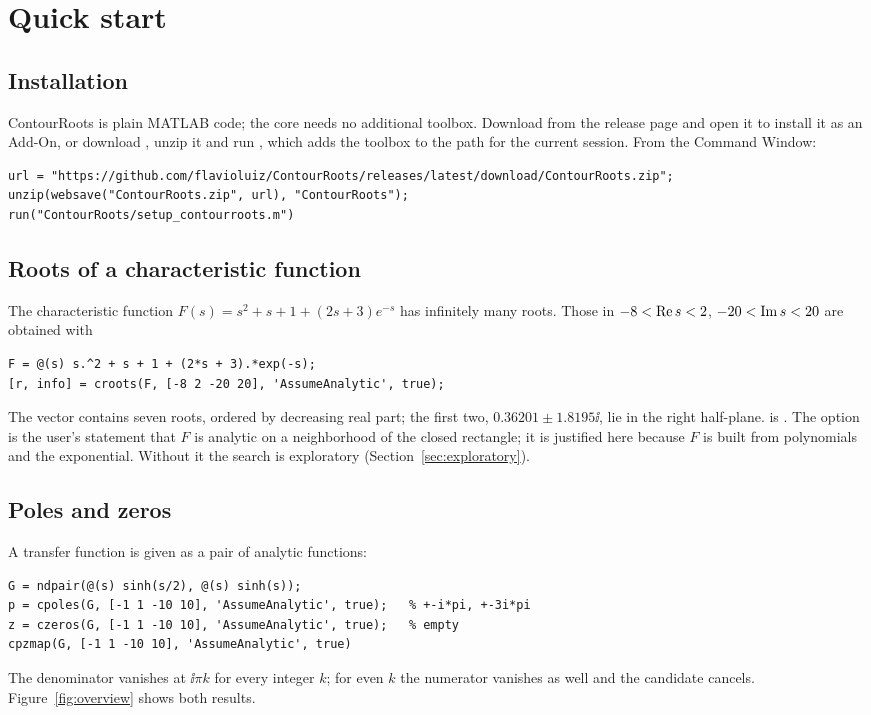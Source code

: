 \chapter{Quick start}\label{ch:quick}

\section{Installation}

ContourRoots is plain MATLAB code; the core needs no additional toolbox.
Download  from the release page and open it to
install it as an Add-On, or download , unzip it and
run , which adds the toolbox to the path for the
current session. From the Command Window:
\begin{lstlisting}
url = "https://github.com/flavioluiz/ContourRoots/releases/latest/download/ContourRoots.zip";
unzip(websave("ContourRoots.zip", url), "ContourRoots");
run("ContourRoots/setup_contourroots.m")
\end{lstlisting}

\section{Roots of a characteristic function}

The characteristic function $F(s)=s^2+s+1+(2s+3)e^{-s}$ has infinitely
many roots. Those in $-8<\operatorname{Re} s<2$, $-20<\operatorname{Im} s<20$ are obtained with
\begin{lstlisting}
F = @(s) s.^2 + s + 1 + (2*s + 3).*exp(-s);
[r, info] = croots(F, [-8 2 -20 20], 'AssumeAnalytic', true);
\end{lstlisting}
The vector  contains seven roots, ordered by decreasing real part;
the first two, $0.36201\pm1.8195\ii$, lie in the right half-plane.
 is . The option
 is the user's statement that $F$ is analytic
on a neighborhood of the closed rectangle; it is justified here because
$F$ is built from polynomials and the exponential. Without it the search
is exploratory (Section~\ref{sec:exploratory}).

\section{Poles and zeros}

A transfer function is given as a pair of analytic functions:
\begin{lstlisting}
G = ndpair(@(s) sinh(s/2), @(s) sinh(s));
p = cpoles(G, [-1 1 -10 10], 'AssumeAnalytic', true);   % +-i*pi, +-3i*pi
z = czeros(G, [-1 1 -10 10], 'AssumeAnalytic', true);   % empty
cpzmap(G, [-1 1 -10 10], 'AssumeAnalytic', true)
\end{lstlisting}
The denominator vanishes at $\ii\pi k$ for every integer $k$; for even $k$
the numerator vanishes as well and the candidate cancels.
Figure~\ref{fig:overview} shows both results.

